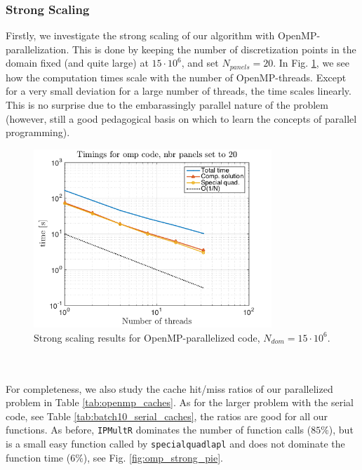 \documentclass[a4paper,10pt]{article}
\begin{document}
\subsubsection*{Strong Scaling}
Firstly, we investigate the strong scaling of our algorithm with OpenMP-parallelization. This is done by keeping the number of discretization points in the domain fixed (and quite large) at $15\cdot10^{6}$, and set $N_{panels}=20$. In Fig. \ref{fig:omp_strongtime}, we see how the computation times scale with the number of OpenMP-threads. Except for a very small deviation for a large number of threads, the time scales linearly. This is no surprise due to the embarassingly parallel nature of the problem (however, still a good pedagogical basis on which to learn the concepts of parallel programming). 
\begin{figure}[ht]
    \begin{center}
        \includegraphics[width=0.8\textwidth]{Graphics/omp_fixed_domain_size_loglog.png}
    \end{center}
    \caption{Strong scaling results for OpenMP-parallelized code, $N_{dom}=15\cdot 10^6$.}
    \label{fig:omp_strongtime}
\end{figure}
\\ \\
For completeness, we also study the cache hit/miss ratios of our parallelized problem in Table \ref{tab:openmp_caches}. As for the larger problem with the serial code, see Table \ref{tab:batch10_serial_caches}, the ratios are good for all our functions. As before, \texttt{IPMultR} dominates the number of function calls ($85\%$), but is a small easy function called by \texttt{specialquadlapl} and does not dominate the function time ($6\%$), see Fig. \ref{fig:omp_strong_pie}. 
\end{document}
